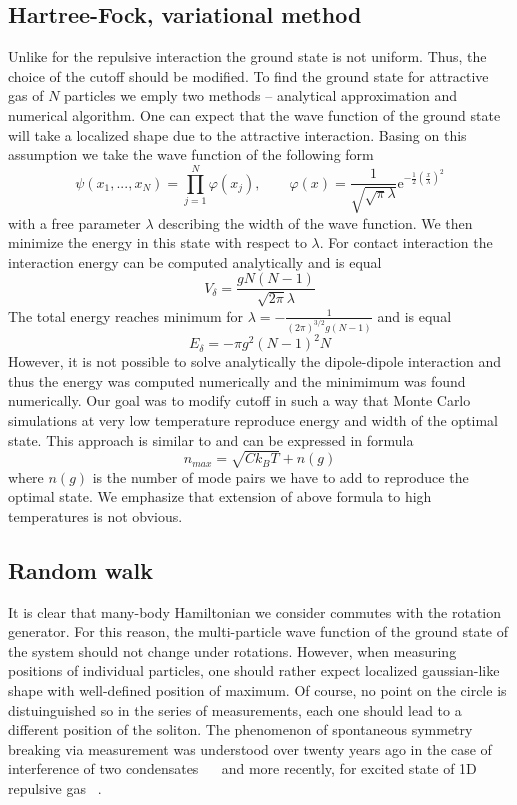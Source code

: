 \documentclass[aps,pra,reprint]{revtex4-2}
\begin{document}
\subsection{Hartree-Fock, variational method}
    Unlike for the repulsive interaction the ground state is not uniform. Thus, the choice of the cutoff should be modified.
    To find the ground state for attractive gas of $N$ particles we emply two methods -- analytical approximation and numerical algorithm. One can expect that the wave function of the ground state will take a localized shape due to the attractive interaction. Basing on this assumption we take the wave function of the following form
    $$ \psi(x_1,...,x_N) =\prod _{j=1}^N \varphi(x_j), \qquad \varphi(x)=\frac{1}{\sqrt{\sqrt{\pi}\lambda}} \text{e}^{-\frac{1}{2}(\frac{x}{\lambda})^2} $$
    with a free parameter $\lambda$ describing the width of the wave function. We then minimize the energy in this state with respect to $\lambda$. For contact interaction the interaction energy can be computed analytically and is equal
    $$ V_{\delta} = \frac{g N(N-1)}{\sqrt{2 \pi} \lambda} $$
    The total energy reaches minimum for $\lambda =-\frac{1}{ (2 \pi) ^{3/2} g (N-1)} $ and is equal
    $$ E_{\delta} = -\pi g^2 (N-1)^2 N $$
    However, it is not possible to solve analytically the dipole-dipole interaction and thus the energy was computed numerically and the minimimum was found numerically.
    Our goal was to modify cutoff in such a way that Monte Carlo simulations at very low temperature reproduce energy and width of the optimal state. This approach is similar to \cite{bienias2011statisticala} and can be expressed in formula
    \begin{equation}
        n_{max}=\sqrt{C k_B T}+n(g)
    \end{equation}
    where $n(g)$ is the number of mode pairs we have to add to reproduce the optimal state. We emphasize that extension of above formula to high temperatures is not obvious.
\subsection{Random walk}
    It is clear that many-body Hamiltonian we consider commutes with the rotation generator. For this reason, the multi-particle wave function of the ground state of the system should not change under rotations. However, when measuring positions of individual particles, one should rather expect localized gaussian-like shape with well-defined position of maximum. Of course, no point on the circle is distuinguished so in the series of measurements, each one should lead to a different position of the soliton. The phenomenon of spontaneous symmetry breaking via measurement was understood over twenty years ago in the case of interference of two condensates ~\cite{javanainen1996quantum}~\cite{andrews1997observation} and more recently, for excited state of 1D repulsive gas ~\cite{syrwid2015lieb}.
    
\end{document}
